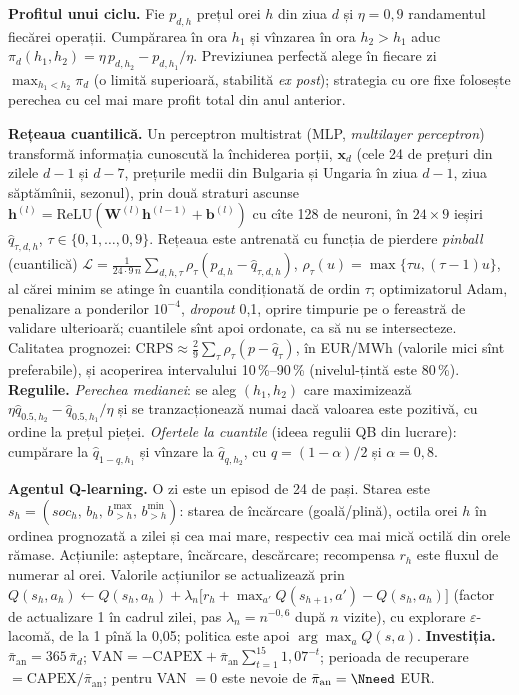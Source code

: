 {\textbf{Profitul unui ciclu.} Fie $p_{d,h}$ prețul orei $h$ din ziua $d$ și $\eta=0{,}9$ randamentul fiecărei operații. Cumpărarea în ora $h_1$ și vînzarea în ora $h_2>h_1$ aduc $\pi_d(h_1,h_2)=\eta\,p_{d,h_2}-p_{d,h_1}/\eta$.
Previziunea perfectă alege în fiecare zi $\max_{h_1<h_2}\pi_d$ (o limită superioară, stabilită \emph{ex post}); strategia cu ore fixe folosește perechea cu cel mai mare profit total din anul anterior.

\textbf{Rețeaua cuantilică.} Un perceptron multistrat (MLP, \emph{multilayer perceptron}) transformă informația cunoscută la închiderea porții, $\mathbf x_d$ (cele 24 de prețuri din zilele $d-1$ și $d-7$, prețurile medii din Bulgaria și Ungaria în ziua $d-1$, ziua săptămînii, sezonul), prin două straturi ascunse $\mathbf h^{(l)}=\mathrm{ReLU}(\mathbf W^{(l)}\mathbf h^{(l-1)}+\mathbf b^{(l)})$ cu cîte 128 de neuroni, în $24\times9$ ieșiri $\hat q_{\tau,d,h}$, $\tau\in\{0{,}1,\dots,0{,}9\}$.
Rețeaua este antrenată cu funcția de pierdere \emph{pinball} (cuantilică) $\mathcal L=\frac{1}{24\cdot 9\,n}\sum_{d,h,\tau}\rho_\tau(p_{d,h}-\hat q_{\tau,d,h})$, $\rho_\tau(u)=\max\{\tau u,(\tau-1)u\}$, al cărei minim se atinge în cuantila condiționată de ordin $\tau$; optimizatorul Adam, penalizare a ponderilor $10^{-4}$, \emph{dropout} 0,1, oprire timpurie pe o fereastră de validare ulterioară; cuantilele sînt apoi ordonate, ca să nu se intersecteze.
Calitatea prognozei: $\mathrm{CRPS}\approx\frac{2}{9}\sum_\tau\rho_\tau(p-\hat q_\tau)$, în EUR/MWh (valorile mici sînt preferabile), și acoperirea intervalului 10\,\%--90\,\% (nivelul-țintă este 80\,\%).
\textbf{Regulile.} \emph{Perechea medianei}: se aleg $(h_1,h_2)$ care maximizează $\eta\hat q_{0.5,h_2}-\hat q_{0.5,h_1}/\eta$ și se tranzacționează numai dacă valoarea este pozitivă, cu ordine la prețul pieței. \emph{Ofertele la cuantile} (ideea regulii QB din lucrare): cumpărare la $\hat q_{1-q,h_1}$ și vînzare la $\hat q_{q,h_2}$, cu $q=(1-\alpha)/2$ și $\alpha=0{,}8$.

\textbf{Agentul Q-learning.} O zi este un episod de 24 de pași. Starea este $s_h=(\mathit{soc}_h,\,b_h,\,b^{\max}_{>h},\,b^{\min}_{>h})$: starea de încărcare (goală/plină), octila orei $h$ în ordinea prognozată a zilei și cea mai mare, respectiv cea mai mică octilă din orele rămase. Acțiunile: așteptare, încărcare, descărcare; recompensa $r_h$ este fluxul de numerar al orei.
Valorile acțiunilor se actualizează prin $Q(s_h,a_h)\leftarrow Q(s_h,a_h)+\lambda_n\big[r_h+\max_{a'}Q(s_{h+1},a')-Q(s_h,a_h)\big]$ (factor de actualizare 1 în cadrul zilei, pas $\lambda_n=n^{-0{,}6}$ după $n$ vizite), cu explorare $\varepsilon$-lacomă, de la 1 pînă la 0,05; politica este apoi $\arg\max_aQ(s,a)$.
\textbf{Investiția.} $\bar\pi_{\mathrm{an}}=365\,\bar\pi_d$; $\mathrm{VAN}=-\mathrm{CAPEX}+\bar\pi_{\mathrm{an}}\sum_{t=1}^{15}1{,}07^{-t}$; perioada de recuperare $=\mathrm{CAPEX}/\bar\pi_{\mathrm{an}}$; pentru VAN $=0$ este nevoie de $\bar\pi_{\mathrm{an}}=\Nneed$ EUR.}
